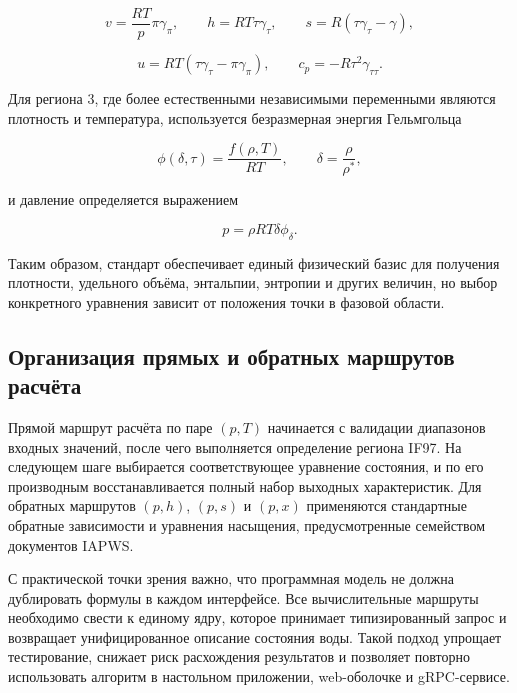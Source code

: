 \begin{equation}
v = \frac{RT}{p} \pi \gamma_{\pi}, \qquad
h = RT \tau \gamma_{\tau}, \qquad
s = R(\tau \gamma_{\tau} - \gamma),
\end{equation}

\begin{equation}
u = RT(\tau \gamma_{\tau} - \pi \gamma_{\pi}), \qquad
c_{p} = -R \tau^{2} \gamma_{\tau\tau}.
\end{equation}

Для региона 3, где более естественными независимыми переменными являются
плотность и температура, используется безразмерная энергия Гельмгольца
\cite{iapws_if97_2012,iapws_vpt_region3}

\begin{equation}
\phi(\delta,\tau) = \frac{f(\rho,T)}{RT}, \qquad
\delta = \frac{\rho}{\rho^{*}},
\end{equation}

и давление определяется выражением

\begin{equation}
p = \rho R T \delta \phi_{\delta}.
\end{equation}

Таким образом, стандарт обеспечивает единый физический базис для получения
плотности, удельного объёма, энтальпии, энтропии и других величин, но выбор
конкретного уравнения зависит от положения точки в фазовой области.

\subsection{Организация прямых и обратных маршрутов расчёта}

Прямой маршрут расчёта по паре $(p, T)$ начинается с валидации диапазонов
входных значений, после чего выполняется определение региона IF97.
На следующем шаге выбирается соответствующее уравнение состояния, и по его
производным восстанавливается полный набор выходных характеристик.
Для обратных маршрутов $(p, h)$, $(p, s)$ и $(p, x)$ применяются стандартные
обратные зависимости и уравнения насыщения, предусмотренные семейством
документов IAPWS.

С практической точки зрения важно, что программная модель не должна дублировать
формулы в каждом интерфейсе.
Все вычислительные маршруты необходимо свести к единому ядру, которое принимает
типизированный запрос и возвращает унифицированное описание состояния воды.
Такой подход упрощает тестирование, снижает риск расхождения результатов и
позволяет повторно использовать алгоритм в настольном приложении, web-оболочке
и gRPC-сервисе.

